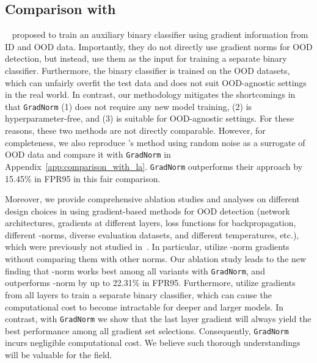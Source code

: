 \documentclass{article}
\begin{document}
\vspace{-0.2cm}
\subsection{Comparison with \citeauthor{lee2020gradients}}
\label{sec:connection_with_al}
\vspace{-0.1cm}
\citeauthor{lee2020gradients}~\cite{lee2020gradients} proposed to train an auxiliary binary classifier using gradient information from ID and OOD data. Importantly, they do not directly use gradient norms for OOD detection, but instead, use them as the input for training a separate binary classifier. Furthermore, the binary classifier is trained on the OOD datasets, which can unfairly overfit the test data and does not suit OOD-agnostic settings in the real world. In contrast, our methodology mitigates the shortcomings in that \texttt{GradNorm} (1) does not require any new model training, (2) is hyperparameter-free, and (3) is suitable for OOD-agnostic settings. For these reasons, these two methods are not directly comparable. However, for completeness, we also reproduce \citeauthor{lee2020gradients}'s method using random noise as a surrogate of OOD data and compare it with \texttt{GradNorm} in Appendix~\ref{app:comparison_with_la}. \texttt{GradNorm} outperforms their approach by 15.45\% in FPR95 in this fair comparison.

Moreover, we provide comprehensive ablation studies and analyses on different design choices in using gradient-based methods for OOD detection (network architectures, gradients at different layers, loss functions for backpropagation, different -norms, diverse evaluation datasets, and different temperatures, etc.), which were previously not studied in~\cite{lee2020gradients}. In particular, \citeauthor{lee2020gradients} utilize -norm gradients without comparing them with other norms. Our ablation study leads to the new finding that -norm works best among all variants with \texttt{GradNorm}, and outperforms -norm by up to 22.31\% in FPR95. Furthermore, \citeauthor{lee2020gradients} utilize gradients from all layers to train a separate binary classifier, which can cause the computational cost to become intractable for deeper and larger models. In contrast, with \texttt{GradNorm} we show that the last layer gradient will always yield the best performance among all gradient set selections. Consequently, \texttt{GradNorm} incurs negligible computational cost. We believe such thorough understandings will be valuable for the field.
\end{document}
